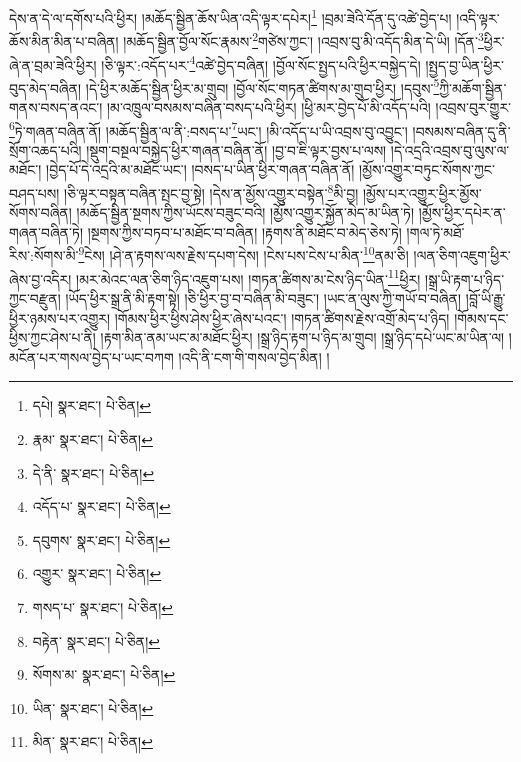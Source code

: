 དེས་ན་དེ་ལ་དགོས་པའི་ཕྱིར། །མཆོད་སྦྱིན་ཆོས་ཡིན་འདི་ལྟར་དཔེར།\footnote{དཔེ།  སྣར་ཐང་།  པེ་ཅིན། } །བྲམ་ཟེའི་དོན་དུ་འཚེ་བྱེད་པ། །འདི་ལྟར་ཆོས་མིན་མིན་པ་བཞིན། །མཆོད་སྦྱིན་བྱོལ་སོང་རྣམས་\footnote{རྣམ་  སྣར་ཐང་།  པེ་ཅིན། }གཙེས་ཀྱང་། །འབྲས་བུ་མི་འདོད་མིན་དེ་ཡི། །དོན་\footnote{དེ་ནི་  སྣར་ཐང་།  པེ་ཅིན། }ཕྱིར་ཞེ་ན་བྲམ་ཟེའི་ཕྱིར། །ཅི་ལྟར་:འདོད་པར་\footnote{འདོད་པ་  སྣར་ཐང་།  པེ་ཅིན། }འཚེ་བྱེད་བཞིན། །བྱོལ་སོང་སྤྱད་པའི་ཕྱིར་བསྐྱེད་དེ། །སྤྱད་བྱ་ཡིན་ཕྱིར་བུད་མེད་བཞིན། །དེ་ཕྱིར་མཆོད་སྦྱིན་ཕྱིར་མ་གྲུབ། །བྱོལ་སོང་གཏན་ཚིགས་མ་གྲུབ་ཕྱིར། །དབུས་\footnote{དབུགས་  སྣར་ཐང་།  པེ་ཅིན། }ཀྱི་མཆོག་སྦྱིན་གནས་བསད་ནའང་། །མ་འཁྲུལ་བསམས་བཞིན་བསད་པའི་ཕྱིར། །ཕྱི་མར་བྱེད་པོ་མི་འདོད་པའི། །འབྲས་བུར་གྱུར་\footnote{འགྱུར་  སྣར་ཐང་།  པེ་ཅིན། }ཏེ་གཞན་བཞིན་ནོ། །མཆོད་སྦྱིན་ལ་ནི་:བསད་པ་\footnote{གསད་པ་  སྣར་ཐང་།  པེ་ཅིན། }ཡང་། །མི་འདོད་པ་ཡི་འབྲས་བུ་འབྱུང་། །བསམས་བཞིན་དུ་ནི་སྲོག་འཆད་པའི། །སྡུག་བསྔལ་བསྐྱེད་ཕྱིར་གཞན་བཞིན་ནོ། །བྱ་བ་ཇི་ལྟར་བྱས་པ་ལས། །དེ་འདྲའི་འབྲས་བུ་ལུས་ལ་མཐོང་། །བྱེད་པོ་དེ་འདྲའི་མ་མཐོང་ཡང་། །བསད་པ་ཡིན་ཕྱིར་གཞན་བཞིན་ནོ། །མྱོས་འགྱུར་བཏུང་སོགས་ཀྱང་བཤད་པས། །ཅི་ལྟར་བསྟན་བཞིན་སྤང་བྱ་སྟེ། །དེས་ན་མྱོས་འགྱུར་བསྟེན་\footnote{བརྟེན་  སྣར་ཐང་།  པེ་ཅིན། }མི་བྱ། །མྱོས་པར་འགྱུར་ཕྱིར་མྱོས་སོགས་བཞིན། །མཆོད་སྦྱིན་སྔགས་ཀྱིས་ཡོངས་བཟུང་བའི། །མྱོས་འགྱུར་སྐྱོན་མེད་མ་ཡིན་ཏེ། །མྱོས་ཕྱིར་དཔེར་ན་གཞན་བཞིན་ཏེ། །སྔགས་ཀྱིས་བཏབ་པ་མཐོང་བ་བཞིན། །རྟགས་ནི་མཐོང་བ་མེད་ཅེས་ཏེ། །གལ་ཏེ་མཐོ་རིས་:སོགས་མི་\footnote{སོགས་མ་  སྣར་ཐང་།  པེ་ཅིན། }ངེས། །ཤེ་ན་རྟགས་ལས་རྗེས་དཔག་དེས། །ངེས་པས་ངེས་པ་མིན་\footnote{ཡིན་  སྣར་ཐང་།  པེ་ཅིན། }ནམ་ཅི། །ལན་ཅིག་འཇུག་ཕྱིར་ཞེས་བྱ་འདིར། །མར་མེའང་ལན་ཅིག་ཉིད་འཇུག་པས། །གཏན་ཚིགས་མ་ངེས་ཉིད་ཡིན་\footnote{མིན་  སྣར་ཐང་།  པེ་ཅིན། }ཕྱིར། །སྒྲ་ཡི་རྟག་པ་ཉིད་ཀྱང་བརྫུན། །ཡོད་ཕྱིར་སྒྲ་ནི་མི་རྟག་སྟེ། །ཅི་ཕྱིར་བྱ་བ་བཞིན་མི་བཟུང་། །ཡང་ན་ལུས་ཀྱི་གཡོ་བ་བཞིན། །བློ་ཡི་རྒྱུ་ཕྱིར་ཉམས་པར་འགྱུར། །གོམས་ཕྱིར་ཕྱིས་ཤེས་ཕྱིར་ཞེས་པའང་། །གཏན་ཚིགས་རྗེས་འགྲོ་མེད་པ་ཉིད། །གོམས་དང་ཕྱིས་ཀྱང་ཤེས་པ་ནི། །རྟག་མིན་ནམ་ཡང་མ་མཐོང་ཕྱིར། །སྒྲ་ཉིད་རྟག་པ་ཉིད་མ་གྲུབ། །སྒྲ་ཉིད་དཔེ་ཡང་མ་ཡིན་ལ། །མངོན་པར་གསལ་བྱེད་པ་ཡང་བཀག །འདི་ནི་ངག་གི་གསལ་བྱེད་མིན། །
